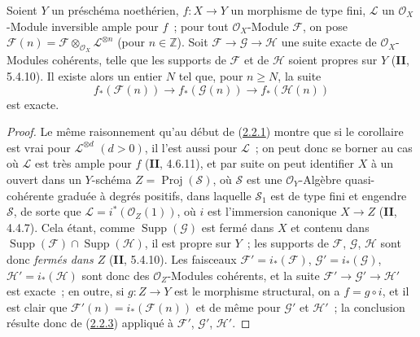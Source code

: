 \begin{corollary}[2.2.4]
\label{III.2.2.4-fr}
Soient $Y$ un préschéma noethérien, $f:X\to Y$ un morphisme de type fini,
$\mathcal L$ un $\mathcal O_X$-Module inversible ample pour $f$~; pour
tout $\mathcal O_X$-Module $\mathcal F$, on pose
$\mathcal F(n)=\mathcal F\otimes_{\mathcal O_X}\mathcal L^{\otimes n}$
(pour $n\in\mathbb Z$). Soit
$\mathcal F\to\mathcal G\to\mathcal H$ une suite exacte de
$\mathcal O_X$-Modules cohérents,
telle que les supports de $\mathcal F$
et de $\mathcal H$ soient propres sur $Y$ \textup{(\textbf{II}, 5.4.10)}. Il existe alors
un entier $N$ tel que, pour $n\geq N$, la suite
\[
f_*(\mathcal F(n))\longrightarrow f_*(\mathcal G(n))
\longrightarrow f_*(\mathcal H(n))
\]
est exacte.
\end{corollary}

\begin{proof}
Le même raisonnement qu'au début de
(\hyperref[III.2.2.1-fr]{2.2.1}) montre que si le corollaire est vrai
pour $\mathcal L^{\otimes d}$ $(d>0)$, il l'est aussi pour $\mathcal L$~;
on peut donc se borner au cas où $\mathcal L$ est très ample pour $f$
(\textbf{II}, 4.6.11), et par suite on peut identifier $X$ à un ouvert dans un
$Y$-schéma $Z=\operatorname{Proj}(\mathcal S)$, où $\mathcal S$ est une
$\mathcal O_Y$-Algèbre quasi-cohérente graduée à degrés positifs, dans
laquelle $\mathcal S_1$ est de type fini et engendre $\mathcal S$, de
sorte que $\mathcal L=i^*(\mathcal O_Z(1))$, où $i$ est l'immersion
canonique $X\to Z$ (\textbf{II}, 4.4.7). Cela étant, comme
$\operatorname{Supp}(\mathcal G)$ est fermé dans $X$ et contenu dans
$\operatorname{Supp}(\mathcal F)\cap\operatorname{Supp}(\mathcal H)$, il
est propre sur $Y$~; les supports de $\mathcal F$, $\mathcal G$,
$\mathcal H$ sont donc \emph{fermés dans $Z$} (\textbf{II}, 5.4.10). Les faisceaux
$\mathcal F'=i_*(\mathcal F)$, $\mathcal G'=i_*(\mathcal G)$,
$\mathcal H'=i_*(\mathcal H)$ sont donc des $\mathcal O_Z$-Modules
cohérents, et la suite $\mathcal F'\to\mathcal G'\to\mathcal H'$ est
exacte~; en outre, si $g:Z\to Y$ est le morphisme structural, on a
$f=g\circ i$, et il est clair que
$\mathcal F'(n)=i_*(\mathcal F(n))$ et de même pour $\mathcal G'$ et
$\mathcal H'$~; la conclusion résulte donc de
(\hyperref[III.2.2.3-fr]{2.2.3}) appliqué à
$\mathcal F'$, $\mathcal G'$, $\mathcal H'$.
\end{proof}

